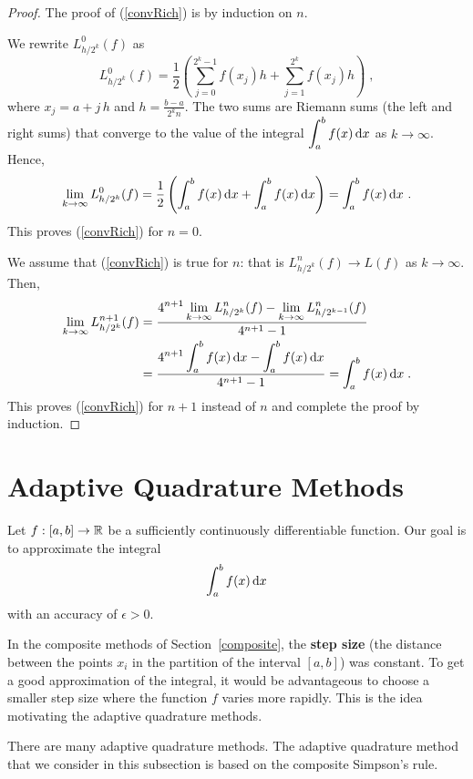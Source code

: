 \begin{proof}
The proof of (\ref{convRich}) is by induction on $n$.

We rewrite $\displaystyle L_{h/2^k}^0(f)$ as
\[
L_{h/2^k}^0(f) = \frac{1}{2} \left( \sum_{j=0}^{2^k-1} f(x_j) h +
\sum_{j=1}^{2^k} f(x_j) h \right) \; ,
\]
where $x_j = a + j\,h$ and $\displaystyle h=\frac{b-a}{2^k n}$.  The
two sums are Riemann sums (the left and right sums) that converge to
the value of the integral
$\displaystyle \int_a^b f(x)\,\mathrm{d}x$ as $k\to \infty$.
Hence,
\[
\lim_{k\to \infty} L_{h/2^k}^0(f) =
\frac{1}{2}\left( \int_a^b f(x)\,\mathrm{d}x + \int_a^b f(x)\,\mathrm{d}x \right)
= \int_a^b f(x)\,\mathrm{d}x \ .
\]
This proves (\ref{convRich}) for $n=0$.

We assume that (\ref{convRich}) is true for $n$: that is
$\displaystyle L_{h/2^k}^{n}(f) \rightarrow L(f)$ as
$k\rightarrow \infty$.
Then,
\begin{align*}
\lim_{k\rightarrow \infty} L_{h/2^k}^{n+1}(f) &=
\frac{\displaystyle 4^{n+1} \lim_{k\rightarrow \infty}L_{h/2^k}^n(f)
- \lim_{k\rightarrow \infty}L_{h/2^{k-1}}^n(f) }
{4^{n+1} - 1} \\
&= \frac{\displaystyle 4^{n+1} \int_a^b f(x) \,\mathrm{d}x - \int_a^b f(x) \,\mathrm{d}x}
{4^{n+1} - 1}
= \int_a^b f(x) \,\mathrm{d}x \; .
\end{align*}
This proves (\ref{convRich}) for $n+1$ instead of $n$ and complete the
proof by induction.
\end{proof}

\section{Adaptive Quadrature Methods}\label{SectAdaptQMethod}

Let $f:[a,b] \rightarrow \mathbb{R}$ be a sufficiently continuously
differentiable function.  Our goal is to approximate the integral
\[
\int_a^b f(x) \,\mathrm{d}x
\]
with an accuracy of $\epsilon >0$.

In the composite methods of Section~\ref{composite}, the
{\bfseries step size} (the distance
between the points $x_i$ in the
partition of the interval $[a,b]$) was constant.  To get a good
approximation of the integral, it would be advantageous to choose a
smaller step size where the function $f$ varies more rapidly.  This is
the idea motivating the adaptive quadrature methods.

There are many adaptive quadrature methods.  The adaptive quadrature
method that we consider in this subsection is based on the composite
Simpson's rule.

